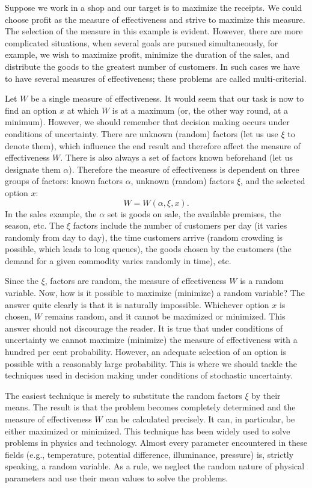 Suppose we work in a shop and our target is to maximize the
receipts. We could choose proﬁt as the measure of effectiveness and
strive to maximize this measure. The selection of the measure in this
example is evident. However, there are more complicated situations,
when several goals are pursued simultaneously, for example, we wish to
maximize proﬁt, minimize the duration of the sales, and distribute the
goods to the greatest number of customers. In such cases we have to
have several measures of effectiveness; these problems are called
multi-criterial.

Let $W$ be a single measure of effectiveness. It would seem that our
task is now to find an option $x$ at which $W$ is at a maximum (or, the
other way round, at a minimum). However, we should remember that
decision making occurs under conditions of uncertainty. There are
unknown (random) factors (let us use $\xi$ to denote them), which inﬂuence
the end result and therefore affect the measure of effectiveness $W$. There
is also always a set of factors known beforehand (let us designate them
$\alpha$). Therefore the measure of effectiveness is dependent on three groups
of factors: known factors $\alpha$, unknown (random) factors $\xi$, and the
selected option $x$:
\begin{equation*}%
W= W(\alpha, \xi, x).
\end{equation*}
In the sales example, the $\alpha$ set is goods on sale, the available premises,
the season, etc. The $\xi$ factors include the number of customers per day
(it varies randomly from day to day), the time customers arrive (random
crowding is possible, which leads to long queues), the goods chosen by
the customers (the demand for a given commodity varies randomly in
time), etc.

Since the $\xi$, factors are random, the measure of effectiveness $W$ is
a random variable. Now, how is it possible to maximize (minimize)
a random variable? The answer quite clearly is that it is naturally
impossible. Whichever option $x$ is chosen, $W$ remains random, and it
cannot be maximized or minimized. This answer should not discourage
the reader. It is true that under conditions of uncertainty we cannot
maximize (minimize) the measure of effectiveness with a hundred per
cent probability. However, an adequate selection of an option is possible
with a reasonably large probability. This is where we should tackle the
techniques used in decision making under conditions of stochastic
uncertainty.

 The easiest
technique is merely to substitute the random factors $\xi$ by their
means. The result is that the problem becomes completely determined
and the measure of effectiveness $W$ can be calculated precisely. It
can, in particular, be either maximized or minimized. This technique
has been widely used to solve problems in physics and
technology. Almost every parameter encountered in these fields (e.g.,
temperature, potential difference, illuminance, pressure) is, strictly
speaking, a random variable. As a rule, we neglect the random nature
of physical parameters and use their mean values to solve the
problems.

